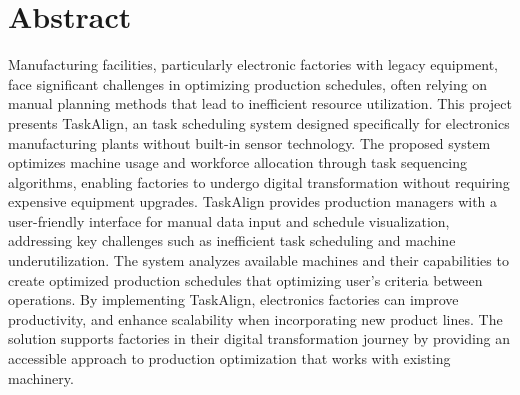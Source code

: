 \chapter*{Abstract}
\label{chap:abstract}

Manufacturing facilities, particularly electronic factories with legacy equipment, face significant challenges in optimizing production schedules, often relying on manual planning methods that lead to inefficient resource utilization. This project presents TaskAlign, an task scheduling system designed specifically for electronics manufacturing plants without built-in sensor technology. The proposed system optimizes machine usage and workforce allocation through task sequencing algorithms, enabling factories to undergo digital transformation without requiring expensive equipment upgrades.
TaskAlign provides production managers with a user-friendly interface for manual data input and schedule visualization, addressing key challenges such as inefficient task scheduling and machine underutilization. The system analyzes available machines and their capabilities to create optimized production schedules that optimizing user's criteria between operations. By implementing TaskAlign, electronics factories can improve productivity, and enhance scalability when incorporating new product lines. The solution supports factories in their digital transformation journey by providing an accessible approach to production optimization that works with existing machinery.